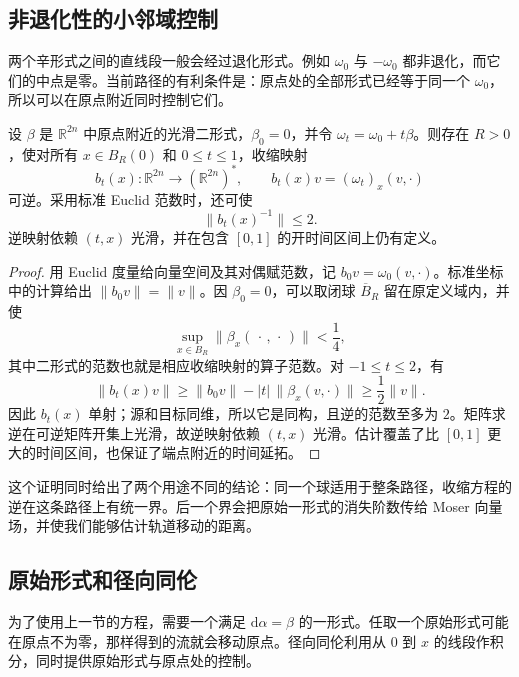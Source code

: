\subsection{非退化性的小邻域控制}
\label{g4:subsec:0802:02}

两个辛形式之间的直线段一般会经过退化形式。例如 \(\omega_0\) 与 \(-\omega_0\) 都非退化，而它们的中点是零。当前路径的有利条件是：原点处的全部形式已经等于同一个 \(\omega_0\)，所以可以在原点附近同时控制它们。

\begin{lemma}
	\label{g4:lem:0802:uniform-nondegeneracy}
	设 \(\beta\) 是 \(\mathbb R^{2n}\) 中原点附近的光滑二形式，\(\beta_0=0\)，并令 \(\omega_t=\omega_0+t\beta\)。则存在 \(R>0\)，使对所有 \(x\in B_R(0)\) 和 \(0\le t\le1\)，收缩映射
	\[
		b_t(x):\mathbb R^{2n}\longrightarrow(\mathbb R^{2n})^*,
		\qquad b_t(x)v=(\omega_t)_x(v,\cdot)
	\]
	可逆。采用标准 Euclid 范数时，还可使
	\[
		\|b_t(x)^{-1}\|\le2.
	\]
	逆映射依赖 \((t,x)\) 光滑，并在包含 \([0,1]\) 的开时间区间上仍有定义。
\end{lemma}
\begin{proof}
	用 Euclid 度量给向量空间及其对偶赋范数，记 \(b_0v=\omega_0(v,\cdot)\)。标准坐标中的计算给出 \(\|b_0v\|=\|v\|\)。因 \(\beta_0=0\)，可以取闭球 \(\overline B_R\) 留在原定义域内，并使
	\[
		\sup_{x\in B_R}\|\beta_x(\,\cdot\,,\,\cdot\,)\|<\frac14,
	\]
	其中二形式的范数也就是相应收缩映射的算子范数。对 \(-1\le t\le2\)，有
	\[
		\|b_t(x)v\|
		\ge\|b_0v\|-|t|\,\|\beta_x(v,\cdot)\|
		\ge\frac12\|v\|.
	\]
	因此 \(b_t(x)\) 单射；源和目标同维，所以它是同构，且逆的范数至多为 \(2\)。矩阵求逆在可逆矩阵开集上光滑，故逆映射依赖 \((t,x)\) 光滑。估计覆盖了比 \([0,1]\) 更大的时间区间，也保证了端点附近的时间延拓。
\end{proof}

这个证明同时给出了两个用途不同的结论：同一个球适用于整条路径，收缩方程的逆在这条路径上有统一界。后一个界会把原始一形式的消失阶数传给 Moser 向量场，并使我们能够估计轨道移动的距离。

\subsection{原始形式和径向同伦}
\label{g4:subsec:0802:03}

为了使用上一节的方程，需要一个满足 \(\mathrm{d}\alpha=\beta\) 的一形式。任取一个原始形式可能在原点不为零，那样得到的流就会移动原点。径向同伦利用从 \(0\) 到 \(x\) 的线段作积分，同时提供原始形式与原点处的控制。

